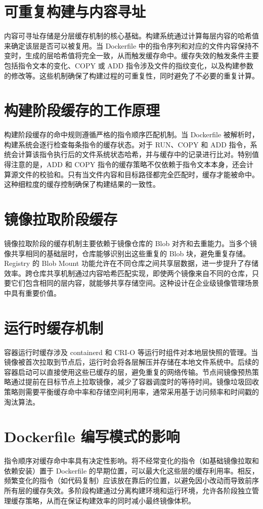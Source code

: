 \chapter{可重复构建与内容寻址}
内容可寻址存储是分层缓存机制的核心基础。构建系统通过计算每层内容的哈希值来确定该层是否可以被复用。当 Dockerfile 中的指令序列和对应的文件内容保持不变时，生成的层哈希值将完全一致，从而触发缓存命中。缓存失效的触发条件主要包括指令文本的变化、COPY 或 ADD 指令涉及文件的指纹变化，以及构建参数的修改等。这些机制确保了构建过程的可重复性，同时避免了不必要的重复计算。\par
\chapter{构建阶段缓存的工作原理}
构建阶段缓存的命中规则遵循严格的指令顺序匹配机制。当 Dockerfile 被解析时，构建系统会逐行检查每条指令的缓存状态。对于 RUN、COPY 和 ADD 指令，系统会计算该指令执行后的文件系统状态哈希，并与缓存中的记录进行比对。特别值得注意的是，ADD 和 COPY 指令的缓存策略不仅依赖于指令文本本身，还会计算源文件的校验和。只有当文件内容和目标路径都完全匹配时，缓存才能被命中。这种细粒度的缓存控制确保了构建结果的一致性。\par
\chapter{镜像拉取阶段缓存}
镜像拉取阶段的缓存机制主要依赖于镜像仓库的 Blob 对齐和去重能力。当多个镜像共享相同的基础层时，仓库能够识别出这些重复的 Blob 块，避免重复存储。Registry 的 Blob Mount 功能允许在不同仓库之间共享层数据，进一步提升了存储效率。跨仓库共享机制通过内容哈希匹配实现，即使两个镜像来自不同的仓库，只要它们包含相同的层内容，就能够共享存储空间。这种设计在企业级镜像管理场景中具有重要价值。\par
\chapter{运行时缓存机制}
容器运行时缓存涉及 containerd 和 CRI-O 等运行时组件对本地层快照的管理。当镜像被首次拉取到节点后，运行时会将各层解压并存储在本地文件系统中。后续的容器启动可以直接使用这些已缓存的层，避免重复的网络传输。节点间镜像预热策略通过提前在目标节点上拉取镜像，减少了容器调度时的等待时间。镜像垃圾回收策略则需要平衡缓存命中率和存储空间利用率，通常采用基于访问频率和时间戳的淘汰算法。\par
\chapter{Dockerfile 编写模式的影响}
指令顺序对缓存命中率具有决定性影响。将不经常变化的指令（如基础镜像拉取和依赖安装）置于 Dockerfile 的早期位置，可以最大化这些层的缓存利用率。相反，频繁变化的指令（如代码复制）应该放在靠后的位置，以避免因小改动而导致前序所有层的缓存失效。多阶段构建通过分离构建环境和运行环境，允许各阶段独立管理缓存策略，从而在保证构建效率的同时减小最终镜像体积。\par
